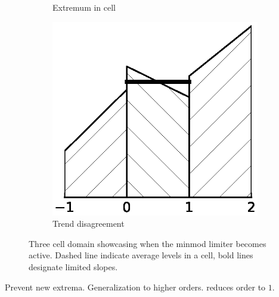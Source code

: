 \begin{figure}[h]
\begin{subfigure}{0.5\columnwidth}
    \caption{Extremum in cell}
    \label{fig:minmod-extremum}
  \end{subfigure}
  \begin{subfigure}{0.5\columnwidth}
    \centering
    \includegraphics[width=\textwidth]{figures/minmod-c}
    \caption{Trend disagreement}
    \label{fig:minmod-trend}
  \end{subfigure}
  \caption{Three cell domain showcasing when the minmod limiter becomes active. Dashed line indicate average levels in a cell, bold lines designate limited slopes.}
  \label{fig:minmod}
\end{figure}

Prevent new extrema.
Generalization to higher orders.
reduces order to $1$.

